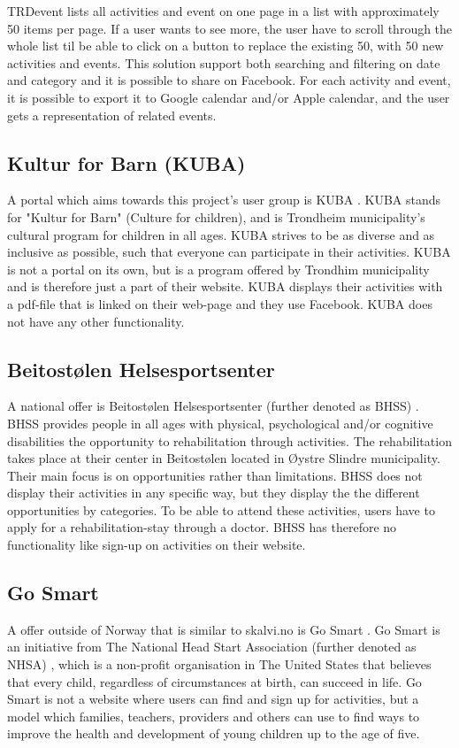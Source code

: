 TRDevent lists all activities and event on one page in a list with approximately 50 items per page. If a user wants to see more, the user have to scroll through the whole list til be able to click on a button to replace the existing 50, with 50 new activities and events. 
This solution support both searching and filtering on date and category and it is possible to share on Facebook. For each activity and event, it is possible to export it to Google calendar and/or Apple calendar, and the user gets a representation of related events. 

\subsection{Kultur for Barn (KUBA)}
A portal which aims towards this project's user group is KUBA \cite{KUBA}. KUBA stands for "Kultur for Barn" (Culture for children), and is Trondheim municipality's cultural program for children in all ages. KUBA strives to be as diverse and as inclusive as possible, such that everyone can participate in their activities. KUBA is not a portal on its own, but is a program offered by Trondhim municipality and is therefore just a part of their website. KUBA displays their activities with a pdf-file that is linked on their web-page and they use Facebook. KUBA does not have any other functionality.

\subsection{Beitostølen Helsesportsenter}
A national offer is Beitostølen Helsesportsenter (further denoted as BHSS) \cite{BHSS}. BHSS provides people in all ages with physical, psychological and/or cognitive disabilities the opportunity to rehabilitation through activities. The rehabilitation takes place at their center in Beitostølen located in Øystre Slindre municipality. Their main focus is on opportunities rather than limitations.  
BHSS does not display their activities in any specific way, but they display the the different opportunities by categories. To be able to attend these activities, users have to apply for a rehabilitation-stay through a doctor. BHSS has therefore no functionality like sign-up on activities on their website.  

\subsection{Go Smart}
A offer outside of Norway that is similar to skalvi.no is Go Smart \cite{GoSart}. Go Smart is an initiative from The National Head Start Association (further denoted as NHSA) \cite{NHSA}, which is a non-profit organisation in The United States that believes that every child, regardless of circumstances at birth, can succeed in life. Go Smart is not a website where users can find and sign up for activities, but a model which families, teachers, providers and others can use to find ways to improve the health and development of young children up to the age of five.


